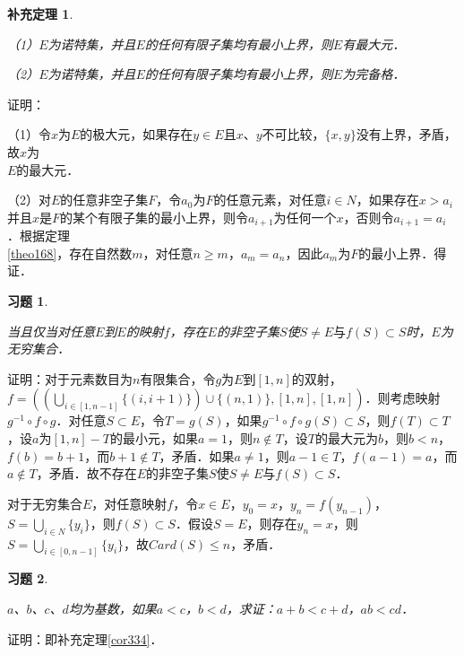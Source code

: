 \documentclass[12pt, a4paper, oneside]{book}
\newtheorem{cor}{补充定理}
\newtheorem{exer}{习题}
\begin{document}
			\begin{cor}\label{cor410}
				\hfill\par
				（1）$E$为诺特集，并且$E$的任何有限子集均有最小上界，则$E$有最大元．
				\par
				（2）$E$为诺特集，并且$E$的任何有限子集均有最小上界，则$E$为完备格．
			\end{cor}
			证明：
			\par
			（1）令$x$为$E$的极大元，如果存在$y\in E$且$x$、$y$不可比较，$\{x, y\}$没有上界，矛盾，故$x$为\\$E$的最大元．
			\par
			（2）对$E$的任意非空子集$F$，令$a_0$为$F$的任意元素，对任意$i\in N$，如果存在$x>a_i$并且$x$是$F$的某个有限子集的最小上界，则令$a_{i+1}$为任何一个$x$，否则令$a_{i+1}=a_i$．根据定理\\\ref{theo168}，存在自然数$m$，对任意$n\geq m$，$a_m=a_n$，因此$a_m$为$F$的最小上界．得证．

			\begin{exer}\label{exer156}
				\hfill\par
				当且仅当对任意$E$到$E$的映射$f$，存在$E$的非空子集$S$使$S\neq E\text{与}f(S)\subset S$时，$E$为无穷集合．
			\end{exer}
			证明：对于元素数目为$n$有限集合，令$g$为$E$到$[1, n]$的双射，$f=((\bigcup\limits_{i\in [1, n-1]}\{(i, i+1)\})\cup\{(n, 1)\}, [1, n], [1, n])$．则考虑映射$g^{-1}\circ f\circ g$．对任意$S\subset E$，令$T=g(S)$，如果$g^{-1}\circ f\circ g(S)\subset S$，则$f(T)\subset T$，设$a$为$[1, n]-T$的最小元，如果$a=1$，则$n\notin T$，设$T$的最大元为$b$，则$b<n$，$f(b)=b+1$，而$b+1\notin T$，矛盾．如果$a\neq 1$，则$a-1\in T$，$f(a-1)=a$，而$a\notin T$，矛盾．故不存在$E$的非空子集$S$使$S\neq E\text{与}f(S)\subset S$．
			\par
			对于无穷集合$E$，对任意映射$f$，令$x\in E$，$y_0=x$，$y_n=f(y_{n-1})$，$S=\bigcup\limits_{i\in N}\{y_i\}$，则$f(S)\subset S$．假设$S=E$，则存在$y_n=x$，则$S=\bigcup\limits_{i\in [0, n-1]}\{y_i\}$，故$Card(S)\leq n$，矛盾．
			
			\begin{exer}\label{exer157}
				\hfill\par
				$a$、$b$、$c$、$d$均为基数，如果$a<c$，$b<d$，求证：$a+b<c+d$，$ab<cd$．
			\end{exer}
			证明：即补充定理\ref{cor334}．
			
\end{document}

